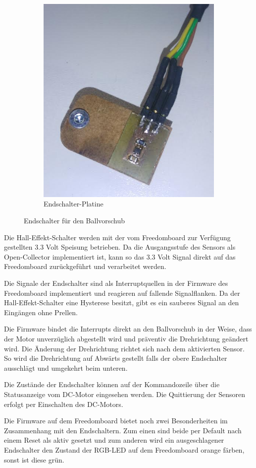 \begin{figure}[h!]
\begin{subfigure}[b]{0.45\textwidth}
		\includegraphics[width=1\textwidth]{../../fig/et/sensor_pcb.png}
		\caption{Endschalter-Platine}
	\end{subfigure}
	\caption{Endschalter für den Ballvorschub}
\end{figure}

Die Hall-Effekt-Schalter werden mit der vom Freedomboard zur Verfügung
gestellten 3.3 Volt Speisung betrieben. Da die Ausgangsstufe des Sensors
als Open-Collector implementiert ist, kann so das 3.3 Volt Signal direkt
auf das Freedomboard zurückgeführt und verarbeitet werden. 

Die Signale der Endschalter sind als Interruptquellen in der Firmware des
Freedomboard implementiert und reagieren auf fallende Signalflanken. Da
der Hall-Effekt-Schalter eine Hysterese besitzt, gibt es ein sauberes
Signal an den Eingängen ohne Prellen.

Die Firmware bindet die Interrupts direkt an den Ballvorschub in der Weise,
dass der Motor unverzüglich abgestellt wird und präventiv die Drehrichtung
geändert wird. Die Änderung der Drehrichtung richtet sich nach dem
aktivierten Sensor. So wird die Drehrichtung auf Abwärts gestellt
falls der obere Endschalter ausschlägt und umgekehrt beim unteren.

Die Zustände der Endschalter können auf der Kommandozeile über die Statusanzeige vom DC-Motor
eingesehen werden. Die Quittierung der Sensoren
erfolgt per Einschalten des DC-Motors.

Die Firmware auf dem Freedomboard bietet noch zwei Besonderheiten im
Zusammenhang mit den Endschaltern. Zum einen sind beide per Default nach
einem Reset als aktiv gesetzt und zum anderen wird ein ausgeschlagener
Endschalter den Zustand der RGB-LED auf dem Freedomboard orange färben,
sonst ist diese grün.
